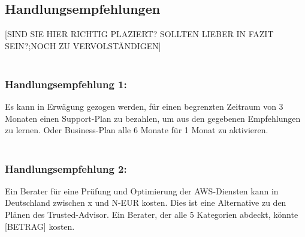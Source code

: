 \subsection*{Handlungsempfehlungen}
[SIND SIE HIER RICHTIG PLAZIERT? SOLLTEN LIEBER IN FAZIT SEIN?;NOCH ZU VERVOLSTÄNDIGEN]
\\\\
\subsubsection*{Handlungsempfehlung 1:} 
Es kann in Erwägung gezogen werden, für einen begrenzten Zeitraum von 3 Monaten einen Support-Plan zu bezahlen, um aus den gegebenen Empfehlungen zu lernen. Oder Business-Plan alle 6 Monate für 1 Monat zu aktivieren.  
\\\\
\subsubsection*{Handlungsempfehlung 2:} 
Ein Berater für eine Prüfung und Optimierung der AWS-Diensten kann in Deutschland zwischen x und N-EUR kosten. Dies ist eine Alternative zu den Plänen des Trusted-Advisor. Ein Berater, der alle 5 Kategorien abdeckt, könnte [BETRAG] kosten. %
\\\\
\begin{comment}
  \subsection*{Umweltbezogene Aspekte}
  \addcontentsline{toc}{subsection}{Umweltbezogene Aspekte} %
  [WORK IN PROGRESS]\\
  In dieser Arbeit geht es um die Überwachung und Optimierung von Cloud-Diensten unter finanziellen Aspekten. 
  
  Serverfarmen und ihre Speichereinheiten  haben Auswirkungen auf die Umwelt, da sie eine große Menge an Strom benötigen. 
  [t.ly/XYMJ]
  \\
  \subsection*{Test von den Werkzeugen und Maßnahmen}
  \addcontentsline{toc}{subsection}{Test von den Werkzeugen und Maßnahmen} %
  Da es in dieser Arbeit zeitlich nicht gelungen ist, die Überwachungswerkzeuge und Optimierungsmaßnahmen umzusetzen, bleibt es noch sie in einer echten Umgebung zu testen. Es wäre möglich zu verifizieren, ob die hier genannten Maßnahmen zur vergleichbaren Einsparungen führen, wie die vom Cloud-Anbieter Amazon genannten.
  
  Amazon bietet ein kostenloses Kontingent an, die jedoch für diese Tests nicht genug war. 
  \\
  \end{comment}
  
